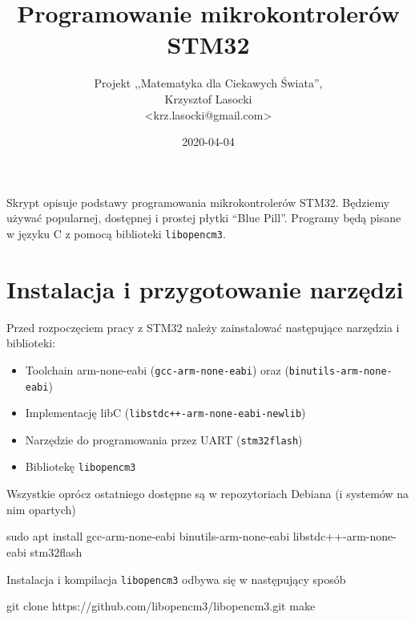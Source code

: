 \documentclass{pdfBooklets}
\title{Programowanie mikrokontrolerów STM32}
\author{%
	Projekt ,,Matematyka dla Ciekawych Świata'',\\
	Krzysztof Lasocki\\\normalsize\ttfamily <krz.lasocki@gmail.com>
}
\date  {2020-04-04}
\begin{document}
\maketitle


Skrypt opisuje podstawy programowania mikrokontrolerów STM32. Będziemy używać
popularnej, dostępnej i prostej płytki ``Blue Pill''. Programy będą pisane w języku
C z pomocą biblioteki \Verb$libopencm3$.

\section{Instalacja i przygotowanie narzędzi}

Przed rozpoczęciem pracy z STM32 należy zainstalować następujące narzędzia i biblioteki:

\begin{itemize}
  \item Toolchain arm-none-eabi (\Verb$gcc-arm-none-eabi$) oraz (\Verb$binutils-arm-none-eabi$)
  \item Implementację libC (\Verb$libstdc++-arm-none-eabi-newlib$)
  \item Narzędzie do programowania przez UART (\Verb$stm32flash$)
  \item Bibliotekę \Verb$libopencm3$
\end{itemize}
Wszystkie oprócz ostatniego dostępne są w repozytoriach Debiana (i systemów na nim opartych)
\begin{CodeFrame*}[bash]{}
sudo apt install gcc-arm-none-eabi binutils-arm-none-eabi libstdc++-arm-none-eabi stm32flash
\end{CodeFrame*}

Instalacja i kompilacja \Verb$libopencm3$ odbywa się w następujący sposób

\begin{CodeFrame*}[bash]{}
git clone https://github.com/libopencm3/libopencm3.git
make
\end{CodeFrame*}
\end{document}
